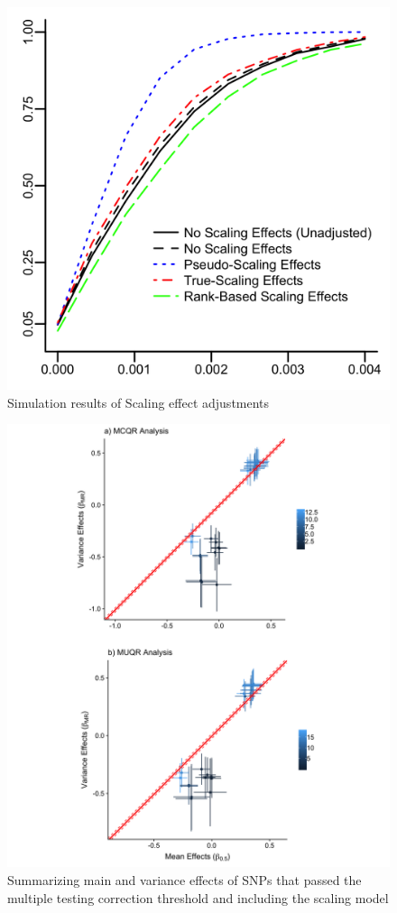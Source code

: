 \documentclass[12pt]{article}
\begin{document}
\newpage
\begin{figure}[h!]
	\centering
	\includegraphics[width=0.6 \textwidth, height=0.6\textwidth]{figures/Power_Curves_Scaling_Adjusted.png}
	\caption{Simulation results of Scaling effect adjustments}
	\label{fig:ScaleEffPower}
\end{figure}

\begin{figure}[h!]
	\centering
	\includegraphics[width=1.2\textwidth, height=1.2\textwidth]{figures/Main_Variance_Effects_w_Scaling_Model.png}
	\caption{Summarizing main and variance effects of SNPs that passed the multiple testing correction threshold and including the scaling model}
	\label{fig:MainVarianceEffectsSelectSNPs}
\end{figure}
\end{document}
